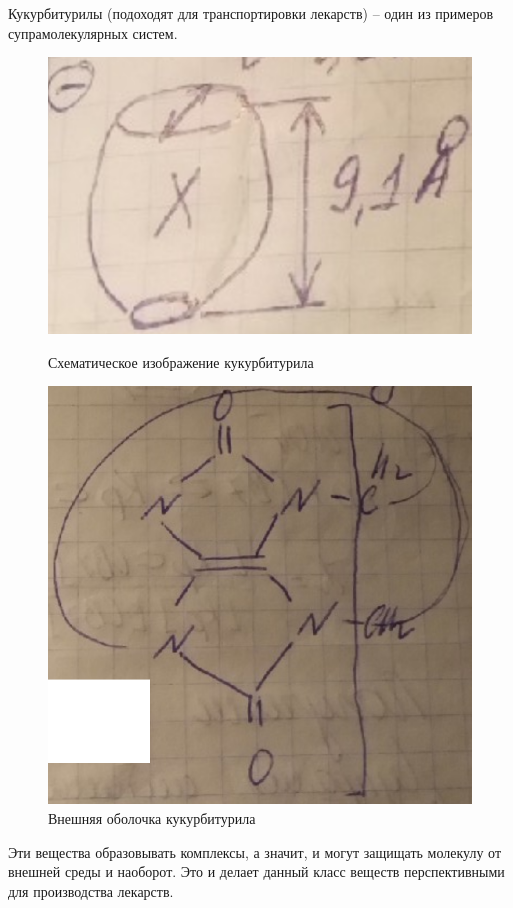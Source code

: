\begin{lecture}
\begin{lecSection}
		\begin{lecSection}
			Кукурбитурилы (подоходят для транспортировки лекарств) -- один из примеров супрамолекулярных систем.
			\begin{figure}[H]
				\begin{minipage}[h]{0.48\linewidth}
					\centering\includegraphics[width=\linewidth]{lecture_08/kukur_scheme}
					\caption{Схематическое изображение кукурбитурила}
				\end{minipage}
				\hfill
				\begin{minipage}[h]{0.48\linewidth}
					\centering\includegraphics[width=0.8\linewidth]{lecture_08/kukur_border}
					\caption{Внешняя оболочка кукурбитурила}
				\end{minipage}
				\hfill
			\end{figure}
		
			Эти вещества образовывать комплексы, а значит, и могут защищать молекулу от внешней среды и наоборот. Это и делает данный класс веществ перспективными для производства лекарств.
		\end{lecSection}
	\end{lecSection}
	
\end{lecture}

